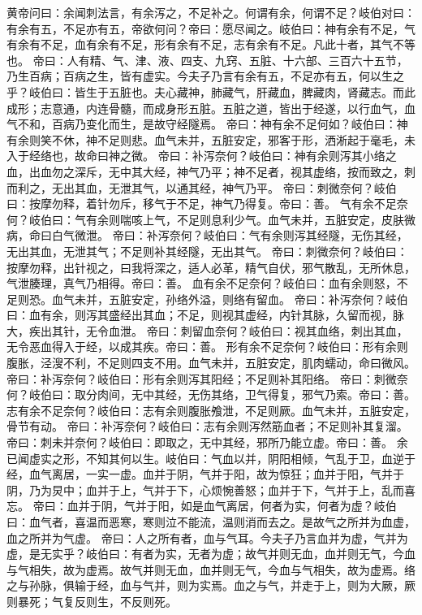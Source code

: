 \documentclass[a4paper,12pt,UTF8,twoside]{ctexbook}
\begin{document}
黄帝问曰：余闻刺法言，有余泻之，不足补之。何谓有余，何谓不足？岐伯对曰：有余有五，不足亦有五，帝欲何问？帝曰：愿尽闻之。岐伯曰：神有余有不足，气有余有不足，血有余有不足，形有余有不足，志有余有不足。凡此十者，其气不等也。
帝曰：人有精、气、津、液、四支、九窍、五脏、十六部、三百六十五节，乃生百病；百病之生，皆有虚实。今夫子乃言有余有五，不足亦有五，何以生之乎？岐伯曰：皆生于五脏也。夫心藏神，肺藏气，肝藏血，脾藏肉，肾藏志。而此成形；志意通，内连骨髓，而成身形五脏。五脏之道，皆出于经遂，以行血气，血气不和，百病乃变化而生，是故守经隧焉。
帝曰：神有余不足何如？岐伯曰：神有余则笑不休，神不足则悲。血气未并，五脏安定，邪客于形，洒淅起于毫毛，未入于经络也，故命曰神之微。
帝曰：补泻奈何？岐伯曰：神有余则泻其小络之血，出血勿之深斥，无中其大经，神气乃平；神不足者，视其虚络，按而致之，刺而利之，无出其血，无泄其气，以通其经，神气乃平。
帝曰：刺微奈何？岐伯曰：按摩勿释，着针勿斥，移气于不足，神气乃得复。帝曰：善。
气有余不足奈何？岐伯曰：气有余则喘咳上气，不足则息利少气。血气未并，五脏安定，皮肤微病，命曰白气微泄。
帝曰：补泻奈何？岐伯曰：气有余则泻其经隧，无伤其经，无出其血，无泄其气；不足则补其经隧，无出其气。
帝曰：刺微奈何？岐伯曰：按摩勿释，出针视之，曰我将深之，适人必革，精气自伏，邪气散乱，无所休息，气泄腠理，真气乃相得。帝曰：善。
血有余不足奈何？岐伯曰：血有余则怒，不足则恐。血气未并，五脏安定，孙络外溢，则络有留血。
帝曰：补泻奈何？岐伯曰：血有余，则泻其盛经出其血；不足，则视其虚经，内针其脉，久留而视，脉大，疾出其针，无令血泄。
帝曰：刺留血奈何？岐伯曰：视其血络，刺出其血，无令恶血得入于经，以成其疾。帝曰：善。
形有余不足奈何？岐伯曰：形有余则腹胀，泾溲不利，不足则四支不用。血气未并，五脏安定，肌肉蠕动，命曰微风。
帝曰：补泻奈何？岐伯曰：形有余则泻其阳经；不足则补其阳络。
帝曰：刺微奈何？岐伯曰：取分肉间，无中其经，无伤其络，卫气得复，邪气乃索。帝曰：善。
志有余不足奈何？岐伯曰：志有余则腹胀飧泄，不足则厥。血气未并，五脏安定，骨节有动。
帝曰：补泻奈何？岐伯曰：志有余则泻然筋血者；不足则补其复溜。
帝曰：刺未并奈何？岐伯曰：即取之，无中其经，邪所乃能立虚。帝曰：善。
余已闻虚实之形，不知其何以生。岐伯曰：气血以并，阴阳相倾，气乱于卫，血逆于经，血气离居，一实一虚。血并于阴，气并于阳，故为惊狂；血并于阳，气并于阴，乃为炅中；血并于上，气并于下，心烦惋善怒；血并于下，气并于上，乱而喜忘。
帝曰：血并于阴，气并于阳，如是血气离居，何者为实，何者为虚？岐伯曰：血气者，喜温而恶寒，寒则泣不能流，温则消而去之。是故气之所并为血虚，血之所并为气虚。
帝曰：人之所有者，血与气耳。今夫子乃言血并为虚，气并为虚，是无实乎？岐伯曰：有者为实，无者为虚；故气并则无血，血并则无气，今血与气相失，故为虚焉。故气并则无血，血并则无气，今血与气相失，故为虚焉。络之与孙脉，俱输于经，血与气并，则为实焉。血之与气，并走于上，则为大厥，厥则暴死；气复反则生，不反则死。
\end{document}
